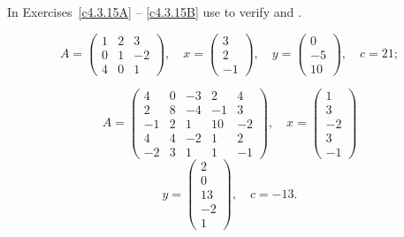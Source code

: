 \documentclass{ximera}
\begin{document}
\noindent In Exercises~\ref{c4.3.15A} -- \ref{c4.3.15B} use \Matlab to
verify  and .
\begin{exercise} \label{c4.3.15A}
\begin{equation*} \label{eq4.3.15a}
A = \left(
\begin{array}{rrr}
 1 & 2 & 3  \\
 0 & 1 & -2  \\
 4 & 0 & 1
\end{array}
\right),\quad
x=\left(
\begin{array}{r}
 3   \\
 2   \\
 -1
\end{array}
\right),\quad
y=\left(
\begin{array}{r}
 0   \\
 -5   \\
 10
\end{array}
\right),\quad c=21;
\end{equation*}
\end{exercise}
\begin{exercise} \label{c4.3.15B}
\begin{equation*} \label{eq4.3.15b}
A = \left(
\begin{array}{rrrrr}
 4 & 0 & -3 & 2 & 4 \\
 2 & 8 & -4 & -1 & 3 \\
 -1 & 2 & 1 & 10 & -2 \\
 4 & 4 & -2 & 1 & 2 \\
 -2 & 3 & 1 & 1 & -1
\end{array}
\right),\quad
x=\left(
\begin{array}{r}
 1   \\
 3   \\
 -2   \\
 3   \\
 -1
\end{array}
\right)
\end{equation*}
\begin{equation*}
y=\left(
\begin{array}{r}
 2   \\
 0   \\
 13   \\
 -2   \\
 1
\end{array}
\right),\quad c=-13.
\end{equation*}
\end{exercise}
\end{document}
